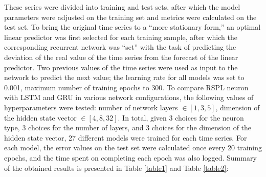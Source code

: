 \documentclass[sn-apa]{sn-jnl}%
\begin{document}
These series were divided into training and test sets, after which the model parameters were adjusted on the training set and metrics were calculated on the test set. To bring the original time series to a “more stationary form,” an optimal linear predictor was first selected for each training sample, after which the corresponding recurrent network was “set” with the task of predicting the deviation of the real value of the time series from the forecast of the linear predictor. Two previous values of the time series were used as input to the network to predict the next value; the learning rate for all models was set to 0.001, maximum number of training epochs to 300. To compare RSPL neuron with LSTM and GRU in various network configurations, the following values of hyperparameters were tested: number of network layers $\in [1, 3, 5]$, dimension of the hidden state vector $\in [4, 8, 32]$.
In total, given 3 choices for the neuron type, 3 choices for the number of layers, and 3 choices for the dimension of the hidden state vector, 27 different models were trained for each time series. For each model, the error values on the test set were calculated once every 20 training epochs, and the time spent on completing each epoch was also logged. Summary of the obtained results is presented in Table \ref{table1} and Table \ref{table2}:
\\
\end{document}
